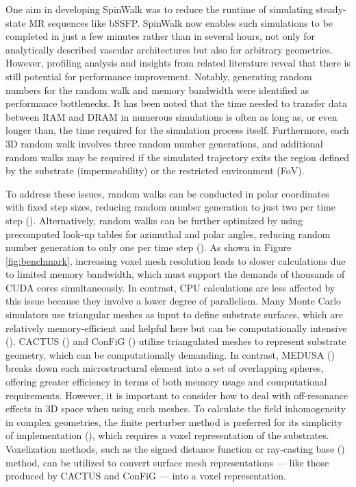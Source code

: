 One aim in developing SpinWalk was to reduce the runtime of simulating steady-state MR sequences like bSSFP. SpinWalk now enables such simulations to be completed in just a few minutes rather than in several hours, not only for analytically described vascular architectures but also for arbitrary geometries. However, profiling analysis and insights from related literature reveal that there is still potential for performance improvement. Notably, generating random numbers for the random walk and memory bandwidth were identified as performance bottlenecks. It has been noted that the time needed to transfer data between RAM and DRAM in numerous simulations is often as long as, or even longer than, the time required for the simulation process itself. Furthermore, each 3D random walk involves three random number generations, and additional random walks may be required if the simulated trajectory exits the region defined by the substrate (impermeability) or the restricted environment (FoV). 

To address these issues, random walks can be conducted in polar coordinates with fixed step sizes, reducing random number generation to just two per time step (\cite{rafael2020robust, lee2021realistic}). Alternatively, random walks can be further optimized by using precomputed look-up tables for azimuthal and polar angles, reducing random number generation to only one per time step (\cite{Sandgaard2024Towards}). As shown in Figure \ref{fig:benchmark}, increasing voxel mesh resolution leads to slower calculations due to limited memory bandwidth, which must support the demands of thousands of CUDA cores simultaneously. In contrast, CPU calculations are less affected by this issue because they involve a lower degree of parallelism. Many Monte Carlo simulators use triangular meshes as input to define substrate surfaces, which are relatively memory-efficient and helpful here but can be computationally intensive (\cite{Riedmatten2024Flexible}). CACTUS (\cite{villarreal2023cactus}) and ConFiG (\cite{callaghan2020config}) utilize triangulated meshes to represent substrate geometry, which can be computationally demanding. In contrast, MEDUSA (\cite{ginsburger2019medusa}) breaks down each microstructural element into a set of overlapping spheres, offering greater efficiency in terms of both memory usage and computational requirements. However, it is important to consider how to deal with off-resonance effects in 3D space when using such meshes. To calculate the field inhomogeneity in complex geometries, the finite perturber method is preferred for its simplicity of implementation (\cite{pathak2008novel}), which requires a voxel representation of the substrates. Voxelization methods, such as the signed distance function or ray-casting base (\cite{roth1982ray, winther2024susceptibility}) method, can be utilized to convert surface mesh representations — like those produced by CACTUS and ConFiG — into a voxel representation.

